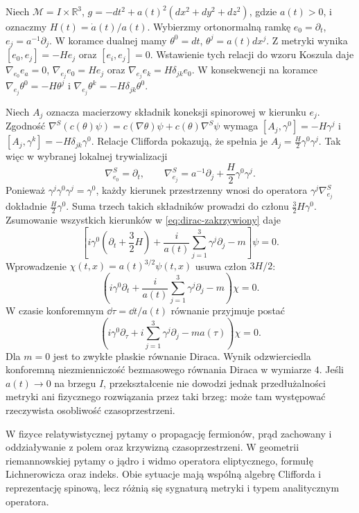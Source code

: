 \begin{przyklad}
\label{prz:dirac-flrw}
Niech $\mathcal M=I\times\mathbb R^3$,
$g=-dt^2+a(t)^2(dx^2+dy^2+dz^2)$, gdzie
$a(t)>0$, i oznaczmy $H(t)=\dot a(t)/a(t)$.
Wybierzmy ortonormalną ramkę
$e_0=\partial_t$, $e_j=a^{-1}\partial_j$.
W koramce dualnej mamy
$\theta^0=dt$, $\theta^j=a(t)dx^j$.
Z metryki wynika
$[e_0,e_j]=-He_j$ oraz $[e_i,e_j]=0$.
Wstawienie tych relacji do wzoru Koszula daje
$\nabla_{e_0}e_a=0$,
$\nabla_{e_j}e_0=He_j$
oraz $\nabla_{e_j}e_k=H\delta_{jk}e_0$.
W konsekwencji na koramce
$\nabla_{e_j}\theta^0=-H\theta^j$ i
$\nabla_{e_j}\theta^k=-H\delta_{jk}\theta^0$.

Niech $A_j$ oznacza macierzowy składnik koneksji
spinorowej w kierunku $e_j$. Zgodność
$\nabla^S(c(\theta)\psi)
=c(\nabla\theta)\psi+c(\theta)\nabla^S\psi$
wymaga
$[A_j,\gamma^0]=-H\gamma^j$ i
$[A_j,\gamma^k]=-H\delta_{jk}\gamma^0$.
Relacje Clifforda pokazują, że spełnia je
$A_j=\tfrac H2\gamma^0\gamma^j$.
Tak więc w wybranej lokalnej trywializacji
\[
 \nabla^S_{e_0}=\partial_t,
 \qquad
 \nabla^S_{e_j}=a^{-1}\partial_j
   +\frac H2\gamma^0\gamma^j.
\]
Ponieważ $\gamma^j\gamma^0\gamma^j=\gamma^0$,
każdy kierunek przestrzenny wnosi do operatora
$\gamma^j\nabla^S_{e_j}$ dokładnie
$\tfrac H2\gamma^0$. Suma trzech takich składników
prowadzi do członu $\tfrac32H\gamma^0$.
Zsumowanie wszystkich kierunków w
\eqref{eq:dirac-zakrzywiony} daje
\begin{equation}\label{eq:dirac-flrw}
 \left[i\gamma^0\left(\partial_t+\frac32H\right)
 +\frac{i}{a(t)}\sum_{j=1}^3\gamma^j\partial_j-m\right]\psi=0.
\end{equation}
Wprowadzenie $\chi(t,x)=a(t)^{3/2}\psi(t,x)$
usuwa człon $3H/2$:
\begin{equation}\label{eq:dirac-flrw-reskalowanie}
 \left(i\gamma^0\partial_t
 +\frac{i}{a(t)}\sum_{j=1}^3\gamma^j\partial_j-m\right)\chi=0.
\end{equation}
W czasie konforemnym $\dd\tau=\dd t/a(t)$
równanie przyjmuje postać
\[
 \left(i\gamma^0\partial_\tau
 +i\sum_{j=1}^3\gamma^j\partial_j-ma(\tau)\right)\chi=0.
\]
Dla $m=0$ jest to zwykłe płaskie równanie
Diraca. Wynik odzwierciedla konforemną
niezmienniczość bezmasowego równania Diraca
w wymiarze $4$. Jeśli $a(t)\to0$ na brzegu $I$,
przekształcenie nie dowodzi jednak przedłużalności
metryki ani fizycznego rozwiązania przez taki brzeg:
może tam występować rzeczywista osobliwość
czasoprzestrzeni.
\end{przyklad}

\begin{uwaga}
W fizyce relatywistycznej pytamy o propagację
fermionów, prąd zachowany i oddziaływanie z polem
oraz krzywizną czasoprzestrzeni. W geometrii
riemannowskiej pytamy o jądro i widmo operatora
eliptycznego, formułę Lichnerowicza oraz indeks.
Obie sytuacje mają wspólną algebrę Clifforda i
reprezentację spinową, lecz różnią się sygnaturą
metryki i typem analitycznym operatora.
\end{uwaga}

